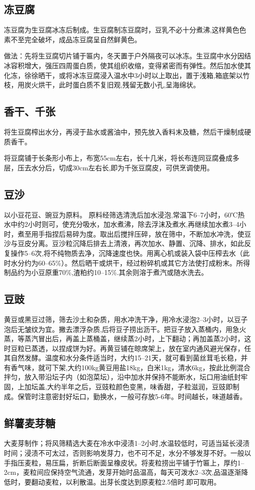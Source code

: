 \documentclass{ctexbook}
\begin{document}
\subsection{冻豆腐}
冻豆腐为生豆腐冰冻后制成。生豆腐制冻豆腐时，豆乳不必十分煮沸,这样黄色色素不至完全破坏，成品冻豆腐呈自然鲜黄色。

做法：先将生豆腐切片铺于匾内，冬天置于户外隔夜可以冰冻。生豆腐中水分因结冰容积增大，强压四周蛋白质，使其组织收缩，变得紧密而有弹性。然后加水使其化冻，徐徐晒干，或将冰冻豆腐浸入温水中3小时以上取出，置于浅箱,箱底架以竹枝，用炭火烘干，此时蛋白质不复旧观,残留无数小孔,呈海绵状。
\subsection{香干、千张}
将生豆腐榨出水分，再浸于盐水或酱油中，预先放入香料末及糖，然后干燥制成硬质香干。

将豆腐铺于长条形小布上，布宽55cm左右，长十几米，将长布连同豆腐叠成多层，压去水分后，切成30cm左右长,即为千张豆腐皮，可供烹调使用。
\subsection{豆沙}
以小豆花豆、豌豆为原料。
原料经筛选清洗后加水浸泡,常温下6--7小时，60℃热水中约2小时则可，使充分吸水，加水煮沸，除去浮沫及煮水,再继续加水煮3--4小时，煮至用手指捏后易碎为度。取出后搅拌压碎，放在筛中，不断加水冲洗，使豆沙与豆皮分离。豆沙粒沉降后排去上清液，再次加水、静置、沉降、排水，如此反复操作5--6次,将不纯物质去净，沉降速度也快。用离心机或装入袋中压榨去水（此时水分约为60--65\%）。然后晒干或烘干，经过粉碎机或其它方法使打成粉末。所得制品约为小豆原重70\%,渣粕约10--15\%.其余则溶于煮汽或随水洗去。
\subsection{豆豉}
黄豆或黑豆过筛，筛去沙土和杂质，用水冲洗干净，用冷水浸泡2--3小时，以豆子泡后无皱纹为宜。撇去漂浮杂质,后将豆子捞出沥干。把豆子放入蒸桶内，用急火蒸，等蒸汽冒出后，再盖上蒸桶盖，继续蒸2小时，上下翻动；再加盖蒸2小时，这时豆粒已蒸透，以捏成饼为好。再黄豆铺在晾席架上，放在室内通风避光保存，任其自然发酵。温度和水分条件适当时，大约15--21天，就可看到菌丝茸毛长稳，并有香气味，就可下架,大约100kg黄豆用盐18kg，白米1kg，清水6kg，按此比例混合拌匀，放入带沿坛子内（如泡菜坛），沿中加水并保持不能断水，坛口用油纸封牢固，上加坛盖,大约半年之后，豆豉粒颜色变黑，味香甜，子粒滋润，豆豉即制成。保管时注意密封好坛口，勤换水，一般可存放5-6年。时间越长，味道越香。
\subsection{鲜薯麦芽糖}
大麦芽制作；将风筛精选大麦在冷水中浸渍1--2小时,水温较低时，可适当延长浸渍时间；浸渍不可太过，否则影响发芽力，也不可不足，水分不够发芽不好。一般以手指压麦粒，易压扁，折断后断面呈橡皮状。将麦粒捞出平铺于竹匾上，厚约1--2cm，麦粒间应保持空气流通，发芽开始时品温高，每天可泼水2--3次,品温逐渐降低时，要翻动麦粒，以利散温。出芽长度达到原麦粒2.5倍时.即可取用。
\end{document}
